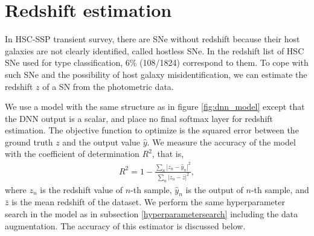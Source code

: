 \documentclass[proof]{pasj01}
\begin{document}
\section*{Redshift estimation}
\label{sec:est_redshift}
In HSC-SSP transient survey, there are SNe without redshift because their host galaxies are not clearly identified, called hostless SNe.
In the redshift list of HSC SNe used for type classification, 6\% (108/1824) correspond to them.
To cope with such SNe and the possibility of host galaxy misidentification,
we can estimate the redshift $z$ of a SN from the photometric data.

We use a model with the same structure as in figure \ref{fig:dnn_model} except that the DNN output is a scalar, and place no final softmax layer for redshift estimation.
The objective function to optimize is the squared error between the ground truth $z$ and the output value $\hat{y}$.
We measure the accuracy of the model with the coefficient of determination $R^2$, that is,
\begin{eqnarray*}
    R^2 = 1 - \frac{\sum_n \left| z_n - \hat{y}_n \right|^2}{\sum_n \left| z_n - \bar{z} \right|^2}, 
\end{eqnarray*}
where $z_n$ is the redshift value of $n$-th sample, $\hat{y}_n$ is the output of $n$-th sample, 
and $\bar{z}$ is the mean redshift of the dataset.
We perform the same hyperparameter search in the model as in subsection \ref{hyperparametersearch} 
including the data augmentation.
The accuracy of this estimator is discussed below.
\end{document}
